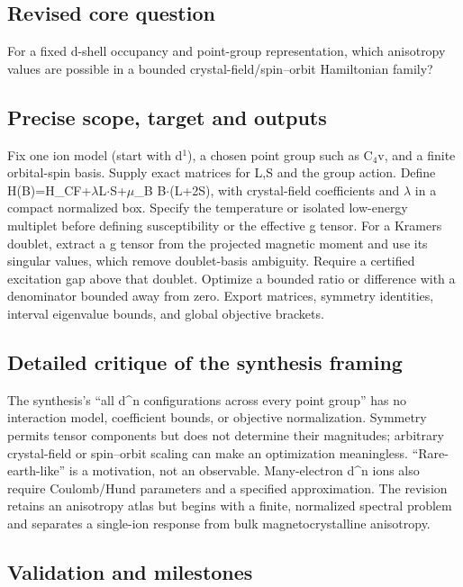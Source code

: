 \documentclass[
  11pt,
]{article}
\begin{document}
\subsection{Revised core question}

For a fixed d-shell occupancy and point-group representation, which
anisotropy values are possible in a bounded crystal-field/spin--orbit
Hamiltonian family?

\subsection{Precise scope, target and outputs}

Fix one ion model (start with d\ensuremath{{}^{1}}), a chosen point
group such as C\ensuremath{{}_{4}}v, and a finite orbital-spin basis.
Supply exact matrices for L,S and the group action. Define
H(B)=H\_CF+\ensuremath{\lambda}L\ensuremath{\cdot}S+\ensuremath{\mu}\_B
B\ensuremath{\cdot}(L+2S), with crystal-field coefficients and
\ensuremath{\lambda} in a compact normalized box. Specify the
temperature or isolated low-energy multiplet before defining
susceptibility or the effective g tensor. For a Kramers doublet, extract
a g tensor from the projected magnetic moment and use its singular
values, which remove doublet-basis ambiguity. Require a certified
excitation gap above that doublet. Optimize a bounded ratio or
difference with a denominator bounded away from zero. Export matrices,
symmetry identities, interval eigenvalue bounds, and global objective
brackets.

\subsection{Detailed critique of the synthesis framing}

The synthesis's ``all d\^{}n configurations across every point group''
has no interaction model, coefficient bounds, or objective
normalization. Symmetry permits tensor components but does not determine
their magnitudes; arbitrary crystal-field or spin--orbit scaling can
make an optimization meaningless. ``Rare-earth-like'' is a motivation,
not an observable. Many-electron d\^{}n ions also require Coulomb/Hund
parameters and a specified approximation. The revision retains an
anisotropy atlas but begins with a finite, normalized spectral problem
and separates a single-ion response from bulk magnetocrystalline
anisotropy.

\subsection{Validation and milestones}
\end{document}
